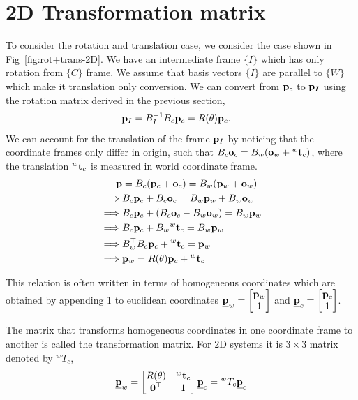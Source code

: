 \documentclass{article}
\begin{document}
\section{2D Transformation matrix}

To consider the rotation and  translation case, we consider  the case shown in Fig~\ref{fig:rot+trans-2D}.
We have  an  intermediate frame $\{I\}$ which has only  rotation from $\{C\}$
frame. We assume that basis   vectors  $\{I\}$ are parallel to $\{W\}$ which
make it translation only conversion. We can convert  from $\mathbf{p}_c$ to $\mathbf{p}_I$
using  the rotation   matrix  derived  in the previous section,
%
\begin{align}
  \mathbf{p}_I  &=  B_I^{-1} B_c \mathbf{p}_c = R(\theta) \mathbf{p}_c.
\end{align}
%
We can account  for the  translation of the frame $\mathbf{p}_I$ by noticing that the
coordinate frames only  differ  in  origin, such that $B_c\mathbf{o}_c =  B_w(\mathbf{o}_w +
{}^w\mathbf{t}_c)$, where   the  translation ${}^w\mathbf{t}_c$ is  measured in  world
coordinate  frame.
\begin{align}
  \mathbf{p}  &=   B_c (\mathbf{p}_c + \mathbf{o}_c) =   B_w (\mathbf{p}_w  +  \mathbf{o}_w)
  \notag\\
  \implies   &B_c \mathbf{p}_c + B_c \mathbf{o}_c =   B_w \mathbf{p}_w  +  B_w \mathbf{o}_w
\notag\\
  \implies   &B_c \mathbf{p}_c + (B_c \mathbf{o}_c -  B_w \mathbf{o}_w)  =   B_w \mathbf{p}_w  
\notag\\
  \implies   &B_c \mathbf{p}_c + B_w {}^w\mathbf{t}_c  =   B_w \mathbf{p}_w  
\notag\\
  \implies   &B_w^{\top}  B_c \mathbf{p}_c + {}^w\mathbf{t}_c  =   \mathbf{p}_w  
\notag\\
  \implies   &\mathbf{p}_w = R(\theta) \mathbf{p}_c + {}^w\mathbf{t}_c
\end{align}

\newcommand{\ubfp}{\underline{\bfp}}
This relation is often written  in  terms of homogeneous   coordinates  which
are   obtained by  appending 1 to euclidean coordinates  $\ubfp_w
= \begin{bmatrix}
  \bfp_w \\ 1   \end{bmatrix}$ and  $\ubfp_c
= \begin{bmatrix}
  \bfp_c \\ 1   \end{bmatrix}$.

The matrix that transforms homogeneous coordinates in one  coordinate  frame to
another is called the transformation matrix. For  2D  systems it is  $3 \times
3$ matrix denoted  by ${}^wT_c$,
%
\begin{align}
  \ubfp_w = \begin{bmatrix}
    R(\theta) & {}^w\bft_c  \\
    \boldsymbol{0}^\top &  1
  \end{bmatrix}  \ubfp_c  = {}^wT_c \ubfp_c
\end{align}
%
\end{document}
